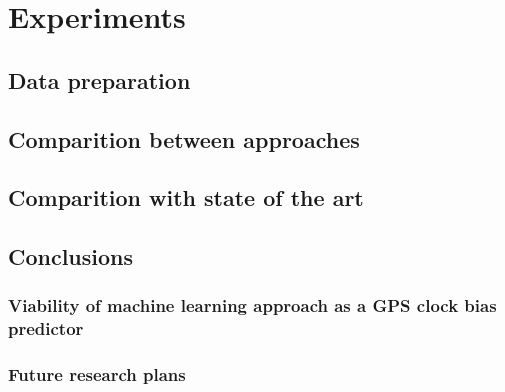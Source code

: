 \chapter{Experiments}


\section{Data preparation}


\section{Comparition between approaches}


\section{Comparition with state of the art}


\section{Conclusions}

\subsection{Viability of machine learning approach as a GPS clock bias predictor}

\subsection{Future research plans}


